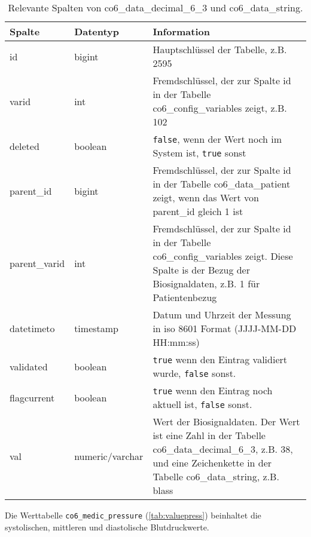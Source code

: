 \begin{longtable}{|l|l|p{7cm}|}
	\caption[Relevante Spalten von co6\_data\_decimal\_6\_3 und \\ co6\_data\_string]{Relevante Spalten von co6\_data\_decimal\_6\_3 und co6\_data\_string.}
	\label{tab:valuetab}
	\endfirsthead
		\hline
		\rowcolor{lightgray} Spalte & Datentyp & Information \\ \hline
		id & bigint & Hauptschlüssel der Tabelle, z.B. 2595 \\ \hline
		varid & int & Fremdschlüssel, der zur Spalte id in der Tabelle co6\_config\_variables zeigt, z.B. 102 \\ \hline
		deleted & boolean & \texttt{false}, wenn der Wert noch im System ist, \texttt{true} sonst \\ \hline
		parent\_id & bigint & Fremdschlüssel, der zur Spalte id in der Tabelle co6\_data\_patient zeigt, wenn das Wert von parent\_id gleich 1 ist \\ \hline
		parent\_varid & int & Fremdschlüssel, der zur Spalte id in der Tabelle co6\_config\_variables zeigt. Diese Spalte is der Bezug der Biosignaldaten, z.B. 1 für Patientenbezug \\ \hline
		datetimeto & timestamp & Datum und Uhrzeit der Messung in \acs{iso} 8601 Format (JJJJ-MM-DD HH:mm:ss)\\ \hline
		validated & boolean & \texttt{true} wenn den Eintrag validiert wurde, \texttt{false} sonst. \\ \hline
		flagcurrent & boolean & \texttt{true} wenn den Eintrag noch aktuell ist, \texttt{false} sonst. \\ \hline
		val & numeric/varchar & Wert der Biosignaldaten. Der Wert ist eine Zahl in der Tabelle co6\_data\_decimal\_6\_3, z.B. 38, und eine Zeichenkette in der Tabelle co6\_data\_string, z.B. blass \\ \hline
\end{longtable}

Die Werttabelle \texttt{co6\_medic\_pressure} (\ref{tab:valuepress}) beinhaltet die systolischen, mittleren und diastolische Blutdruckwerte.

